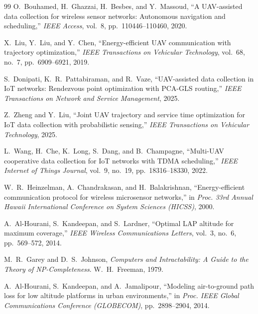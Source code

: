 \documentclass[12pt, a4paper, oneside]{report}
\begin{document}
\begin{thebibliography}{99}
O.~Bouhamed, H.~Ghazzai, H.~Besbes, and Y.~Massoud, ``A UAV-assisted data collection for wireless sensor networks: Autonomous navigation and scheduling,'' \textit{IEEE Access}, vol.~8, pp.~110446--110460, 2020.

X.~Liu, Y.~Liu, and Y.~Chen, ``Energy-efficient UAV communication with trajectory optimization,'' \textit{IEEE Transactions on Vehicular Technology}, vol.~68, no.~7, pp.~6909--6921, 2019.

S.~Donipati, K.~R.~Pattabiraman, and R.~Vaze, ``UAV-assisted data collection in IoT networks: Rendezvous point optimization with PCA-GLS routing,'' \textit{IEEE Transactions on Network and Service Management}, 2025.

Z.~Zheng and Y.~Liu, ``Joint UAV trajectory and service time optimization for IoT data collection with probabilistic sensing,'' \textit{IEEE Transactions on Vehicular Technology}, 2025.

L.~Wang, H.~Che, K.~Long, S.~Dang, and B.~Champagne, ``Multi-UAV cooperative data collection for IoT networks with TDMA scheduling,'' \textit{IEEE Internet of Things Journal}, vol.~9, no.~19, pp.~18316--18330, 2022.

W.~R.~Heinzelman, A.~Chandrakasan, and H.~Balakrishnan, ``Energy-efficient communication protocol for wireless microsensor networks,'' in \textit{Proc. 33rd Annual Hawaii International Conference on System Sciences (HICSS)}, 2000.

A.~Al-Hourani, S.~Kandeepan, and S.~Lardner, ``Optimal LAP altitude for maximum coverage,'' \textit{IEEE Wireless Communications Letters}, vol.~3, no.~6, pp.~569--572, 2014.

M.~R.~Garey and D.~S.~Johnson, \textit{Computers and Intractability: A Guide to the Theory of NP-Completeness}. W.~H.~Freeman, 1979.

A.~Al-Hourani, S.~Kandeepan, and A.~Jamalipour, ``Modeling air-to-ground path loss for low altitude platforms in urban environments,'' in \textit{Proc. IEEE Global Communications Conference (GLOBECOM)}, pp.~2898--2904, 2014.

\end{thebibliography}


\end{document}
